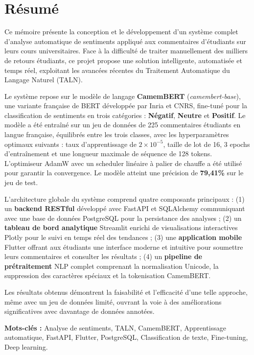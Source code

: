 \chapter*{Résumé}

\begin{tcolorbox}[
  enhanced,
  colback=bleuprincipal!5!white,
  colframe=bleuprincipal,
  boxrule=1.5pt, arc=6pt,
  left=10pt, right=10pt, top=8pt, bottom=8pt
]

Ce mémoire présente la conception et le développement d'un système complet
d'analyse automatique de sentiments appliqué aux commentaires d'étudiants
sur leurs cours universitaires. Face à la difficulté de traiter manuellement
des milliers de retours étudiants, ce projet propose une solution intelligente,
automatisée et temps réel, exploitant les avancées récentes du Traitement
Automatique du Langage Naturel (TALN).

\vspace{0.5em}

Le système repose sur le modèle de langage \textbf{CamemBERT}
(\textit{camembert-base}), une variante française de BERT développée par
Inria et CNRS, fine-tuné pour la classification de sentiments en trois
catégories : \textbf{Négatif}, \textbf{Neutre} et \textbf{Positif}. Le modèle
a été entraîné sur un jeu de données de 225 commentaires étudiants en langue
française, équilibrés entre les trois classes, avec les hyperparamètres
optimaux suivants : taux d'apprentissage de $2 \times 10^{-5}$, taille de
lot de 16, 3 epochs d'entraînement et une longueur maximale de séquence de
128 tokens. L'optimiseur AdamW avec un scheduler linéaire à palier de
chauffe a été utilisé pour garantir la convergence. Le modèle atteint
une précision de \textbf{79,41\%} sur le jeu de test.

\vspace{0.5em}

L'architecture globale du système comprend quatre composants principaux :
(1) un \textbf{backend RESTful} développé avec FastAPI et SQLAlchemy
communiquant avec une base de données PostgreSQL pour la persistance des
analyses ; (2) un \textbf{tableau de bord analytique} Streamlit enrichi
de visualisations interactives Plotly pour le suivi en temps réel des
tendances ; (3) une \textbf{application mobile} Flutter offrant aux
étudiants une interface moderne et intuitive pour soumettre leurs commentaires
et consulter les résultats ; (4) un \textbf{pipeline de prétraitement}
NLP complet comprenant la normalisation Unicode, la suppression des caractères
spéciaux et la tokenisation CamemBERT.

\vspace{0.5em}

Les résultats obtenus démontrent la faisabilité et l'efficacité d'une telle
approche, même avec un jeu de données limité, ouvrant la voie à des
améliorations significatives avec davantage de données annotées.

\end{tcolorbox}

\vspace{0.8em}
\noindent\textbf{Mots-clés :} Analyse de sentiments, TALN, CamemBERT,
Apprentissage automatique, FastAPI, Flutter, PostgreSQL, Classification de
texte, Fine-tuning, Deep learning.

\cleardoublepage
